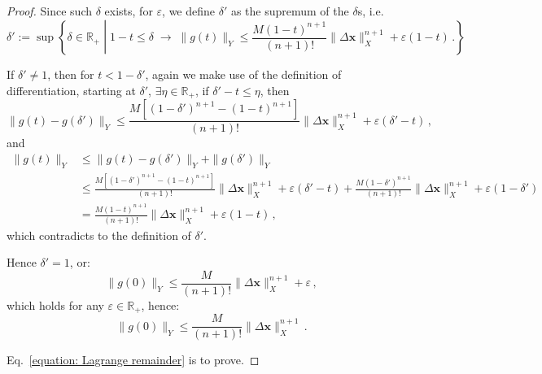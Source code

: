 \documentclass[openany]{book}
\theoremstyle{plain}
\theoremstyle{definition}
\newcommand*{\bv}{\boldsymbol} %
\begin{document}
\begin{proof}
	Since such $\delta$ exists, for $\varepsilon$, we define $\delta'$ as the supremum of the $\delta$s\cite[p.~64]{coleman2012calculus}, i.e.\ 
	\begin{equation*}
		\delta' := \sup \left\{
			\delta \in \mathbb R_+ 
			\middle| 
			1 - t \leq \delta \;\to\; \|g(t)\|_Y \leq \frac{M (1-t)^{n + 1}}{(n + 1)!} \|\Delta \bv x\|_X^{n+1} + \varepsilon (1 - t)\,.
		\right\}
	\end{equation*}

	If $\delta' \neq 1$, then for $ t < 1 - \delta'$, again we make use of the definition of differentiation, starting at $\delta'$, $\exists \eta \in \mathbb R_+$, if $\delta' - t \leq \eta$, then
	\begin{equation*}
		\|g(t) - g(\delta')\|_Y \leq \frac{M [(1-\delta')^{n + 1} - (1 - t)^{n+1}]}{(n + 1)!} \|\Delta \bv x\|_X^{n+1} + \varepsilon (\delta' - t) \,,
	\end{equation*}
	and
	\begin{align*}
		\|g(t)\|_Y &\leq \|g(t) - g(\delta')\|_Y + \|g(\delta')\|_Y
		\\
		&\leq \frac{M [(1-\delta')^{n + 1} - (1 - t)^{n+1}]}{(n + 1)!} \|\Delta \bv x\|_X^{n+1} 
			+ \varepsilon (\delta' - t) 
		+ \frac{M (1-\delta')^{n + 1}}{(n + 1)!} \|\Delta \bv x\|_X^{n+1} 
			+ \varepsilon (1 - \delta')
		\\
		&=  \frac{M (1-t)^{n + 1}}{(n + 1)!} \|\Delta \bv x\|_X^{n+1} + \varepsilon (1 - t)\,,
	\end{align*}
	which contradicts to the definition of $\delta'$.

	Hence $\delta' = 1$, or:
	\begin{equation*}
		\|g(0)\|_Y \leq \frac{M}{(n + 1)!} \|\Delta \bv x\|_X^{n+1} + \varepsilon\,,
	\end{equation*}
	which holds for any $\varepsilon \in \mathbb R_+$, hence:
	\begin{equation}\label{equation: Lagrange remainder}
		\|g(0)\|_Y \leq \frac{M}{(n + 1)!} \|\Delta \bv x\|_X^{n+1}\,.
	\end{equation}

	Eq.~\eqref{equation: Lagrange remainder} is to prove.
\end{proof}
\end{document}

